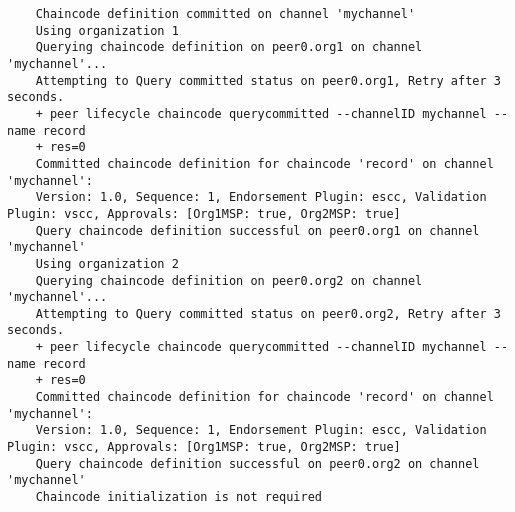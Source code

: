\begin{lstlisting}
    Chaincode definition committed on channel 'mychannel'
    Using organization 1
    Querying chaincode definition on peer0.org1 on channel 'mychannel'...
    Attempting to Query committed status on peer0.org1, Retry after 3 seconds.
    + peer lifecycle chaincode querycommitted --channelID mychannel --name record
    + res=0
    Committed chaincode definition for chaincode 'record' on channel 'mychannel':
    Version: 1.0, Sequence: 1, Endorsement Plugin: escc, Validation Plugin: vscc, Approvals: [Org1MSP: true, Org2MSP: true]
    Query chaincode definition successful on peer0.org1 on channel 'mychannel'
    Using organization 2
    Querying chaincode definition on peer0.org2 on channel 'mychannel'...
    Attempting to Query committed status on peer0.org2, Retry after 3 seconds.
    + peer lifecycle chaincode querycommitted --channelID mychannel --name record
    + res=0
    Committed chaincode definition for chaincode 'record' on channel 'mychannel':
    Version: 1.0, Sequence: 1, Endorsement Plugin: escc, Validation Plugin: vscc, Approvals: [Org1MSP: true, Org2MSP: true]
    Query chaincode definition successful on peer0.org2 on channel 'mychannel'
    Chaincode initialization is not required
\end{lstlisting}